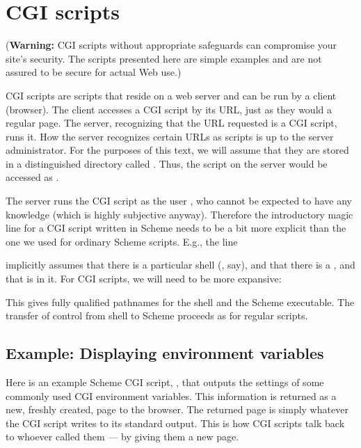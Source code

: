 \chapter{CGI scripts}

{\color[rgb]{1,0,0}({\bf Warning:} CGI scripts without
appropriate safeguards can compromise your site’s
security.  The scripts presented here are simple
examples and are not assured to be secure for actual
Web use.)}

\medskip

CGI scripts \cite{cgi} are scripts that reside on a
web server and can be run by a client (browser).  The
client accesses a CGI script by its URL, just as they
would a regular page.  The server, recognizing that the
URL requested is a CGI script, runs it.  How the server
recognizes certain URLs as scripts is up to the server
administrator.  For the purposes of this text, we will
assume that they are stored in a distinguished
directory called .  Thus, the script
 on the server  would
be accessed as .

The server runs the CGI script as the user ,
who cannot be expected to have any
 knowledge (which is highly subjective
anyway).  Therefore the introductory magic line for a
CGI script written in Scheme needs to be a bit more
explicit than the one we used for ordinary Scheme
scripts.  E.g., the line


\n implicitly assumes that there is a particular shell
(, say), and that there is a , and that
 is in it.  For CGI scripts, we will need
to be more expansive:


This gives fully qualified pathnames for the shell and
the Scheme executable.  The transfer of control from
shell to Scheme proceeds as for regular scripts.

\section{Example: Displaying environment variables}

Here is an example Scheme CGI script,
, that outputs the settings of some
commonly used CGI environment variables.  This
information is returned as a new, freshly created, page
to the browser.  The returned page is simply whatever
the CGI script writes to its standard output.  This is
how CGI scripts talk back to whoever called them — by
giving them a new page.

